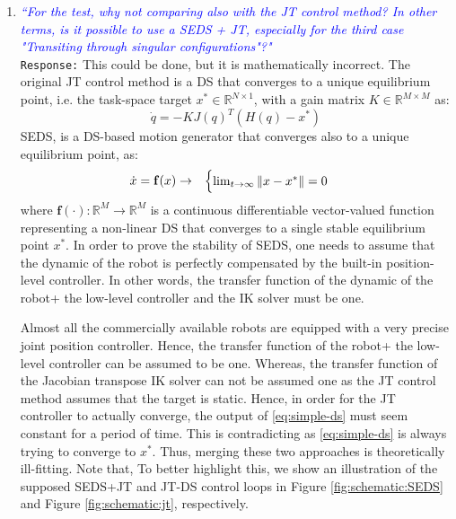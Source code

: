 \documentclass{article}
\begin{document}
\begin{enumerate}




\item \textcolor{blue}{\textit{``For the test, why not comparing also with the JT control method? In
other terms, is it possible to use a SEDS + JT, especially for the
third case "Transiting through singular configurations"?"}}\\
\texttt{Response:} \small This could be done, but it is mathematically incorrect. The original JT control method is a DS that converges to a unique equilibrium point, i.e. the task-space target $x^*\in \mathbb{R}^{N\times 1}$, with a gain matrix $K \in \mathbb{R}^{M\times M}$ as:\begin{equation}
\dot{q} = - KJ(q)^T(H(q)- x^*) 
\label{eq:JT}
\end{equation}
SEDS, is a DS-based motion generator that converges also to a unique equilibrium point, as:
\begin{equation}
\hfill \begin{aligned}
&  \dot{x}  = \mathbf{f}(x)
\rightarrow  &
\begin{cases}
\lim_{t \rightarrow \infty}\|x - x^*\|=0
\end{cases}
\end{aligned}  \hfill
\label{eq:simple-ds}
\end{equation}
where $\mathbf{f}(\cdot): \mathbb{R}^M \rightarrow \mathbb{R}^M$ is a continuous differentiable vector-valued function representing a non-linear DS that converges to a single stable equilibrium point $x^*$. In order to prove the stability of SEDS, one needs to assume that the dynamic of the robot is perfectly compensated by the built-in position-level controller. In other words, the transfer function of the dynamic of the robot+ the low-level controller and the IK solver must be one. 

Almost all the commercially available robots are equipped with a very precise joint position controller. Hence, the transfer function of the robot+ the low-level controller can be assumed to be one. Whereas, the transfer function of the Jacobian transpose IK solver can not be assumed one as the JT control method assumes that the target is static. Hence, in order for the JT controller to actually converge, the output of \eqref{eq:simple-ds} must seem constant for a period of time. This is contradicting as \eqref{eq:simple-ds} is always trying to converge to $x^*$. Thus, merging these two approaches is theoretically ill-fitting. Note that,  To better highlight this, we show an illustration of the supposed SEDS+JT and JT-DS control loops in Figure \ref{fig:schematic:SEDS} and  Figure \ref{fig:schematic:jt}, respectively.\\




\end{enumerate}
\end{document}
